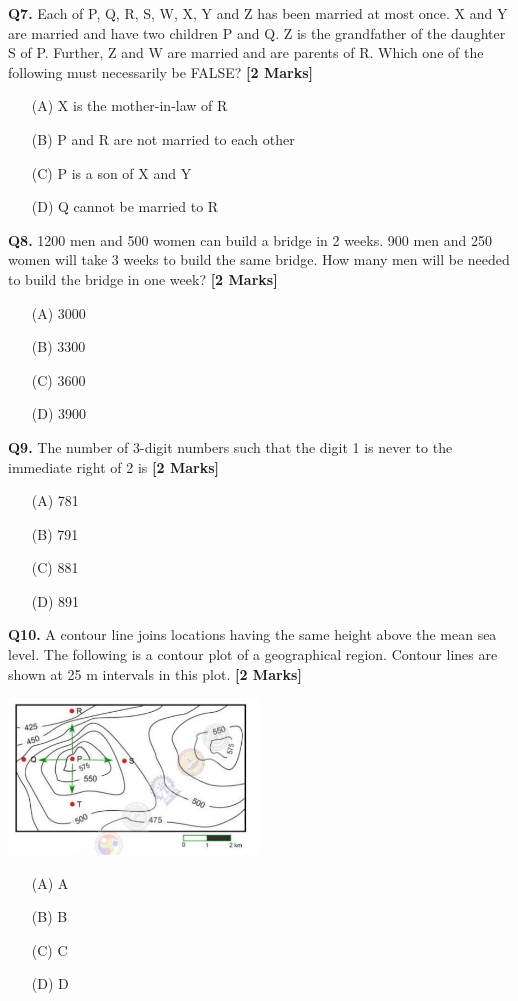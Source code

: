 \documentclass[11pt]{article}
\newcommand{\questionb}[2]{
    \noindent\textbf{Q#2.} #1 \hfill \textbf{[2 Marks]}
}
\begin{document}
\questionb{Each of P, Q, R, S, W, X, Y and Z has been married at most once. X and Y are married and have two children P and Q. Z is the grandfather of the daughter S of P. Further, Z and W are married and are parents of R. Which one of the following must necessarily be FALSE?}{7}
\begin{enumerate}
    \item[(A)] X is the mother-in-law of R
    \item[(B)] P and R are not married to each other
    \item[(C)] P is a son of X and Y
    \item[(D)] Q cannot be married to R
\end{enumerate}
\vspace{0.5cm}

\questionb{1200 men and 500 women can build a bridge in 2 weeks. 900 men and 250 women will take 3 weeks to build the same bridge. How many men will be needed to build the bridge in one week?}{8}
\begin{enumerate}
    \item[(A)] 3000
    \item[(B)] 3300
    \item[(C)] 3600
    \item[(D)] 3900
\end{enumerate}
\vspace{0.5cm}

\questionb{The number of 3-digit numbers such that the digit 1 is never to the immediate right of 2 is}{9}
\begin{enumerate}
    \item[(A)] 781
    \item[(B)] 791
    \item[(C)] 881
    \item[(D)] 891
\end{enumerate}
\vspace{0.5cm}

\questionb{A contour line joins locations having the same height above the mean sea level. The following is a contour plot of a geographical region. Contour lines are shown at 25 m intervals in this plot.}{10}
\begin{center}
\includegraphics[width=0.5\textwidth]{figures/10.png}
\end{center}
\begin{enumerate}
    \item[(A)] A
    \item[(B)] B
    \item[(C)] C
    \item[(D)] D
\end{enumerate}
\vspace{0.5cm}
\end{document}
